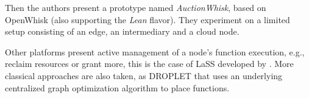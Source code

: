 \documentclass[11pt]{sdm}
\begin{document}
\begin{description}
		Then the authors present a prototype named \emph{AuctionWhisk}, based on OpenWhisk (also supporting the \emph{Lean} flavor). They experiment on a limited setup consisting of an edge, an intermediary and a cloud node.


\end{description}

Other platforms present active management of a node's function execution, e.g., reclaim resources or grant more, this is the case of \gls{LaSS} developed by \citet{wang_lass_2021}. More classical approaches are also taken, as  DROPLET that uses an underlying centralized graph optimization algorithm to place functions.







\end{document}
